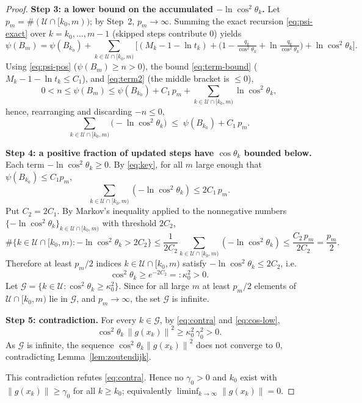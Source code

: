 \documentclass{amsart}
\theoremstyle{definition}
\newcommand{\norm}[1]{\left\lVert #1\right\rVert}
\begin{document}
\begin{proof}
\medskip\noindent\textbf{Step 3: a lower bound on the accumulated
$-\ln\cos^2\theta_k$.}
Let $p_m=\#(\mathcal{U}\cap[k_0,m))$; by Step~2, $p_m\to\infty$. Summing the
exact recursion \eqref{eq:psi-exact} over $k=k_0,\dots,m-1$ (skipped steps
contribute $0$) yields
\[
   \psi(B_m)=\psi(B_{k_0})
   +\!\!\sum_{k\in\mathcal{U}\cap[k_0,m)}\!\!
   \Big[(M_k-1-\ln t_k)
   +\big(1-\tfrac{q_k}{\cos^2\theta_k}+\ln\tfrac{q_k}{\cos^2\theta_k}\big)
   +\ln\cos^2\theta_k\Big].
\]
Using \eqref{eq:psi-pos} ($\psi(B_m)\ge n>0$), the bound \eqref{eq:term-bound}
($M_k-1-\ln t_k\le C_1$), and \eqref{eq:term2} (the middle bracket is $\le0$),
\[
   0<n\le\psi(B_m)\le\psi(B_{k_0})+C_1\,p_m
   +\!\!\sum_{k\in\mathcal{U}\cap[k_0,m)}\!\!\ln\cos^2\theta_k ,
\]
hence, rearranging and discarding $-n\le0$,
\begin{equation}\label{eq:key}
   \sum_{k\in\mathcal{U}\cap[k_0,m)}\big(-\ln\cos^2\theta_k\big)
   \;\le\;\psi(B_{k_0})+C_1\,p_m .
\end{equation}

\medskip\noindent\textbf{Step 4: a positive fraction of updated steps have
$\cos\theta_k$ bounded below.}
Each term $-\ln\cos^2\theta_k\ge0$. By \eqref{eq:key}, for all $m$ large enough
that $\psi(B_{k_0})\le C_1 p_m$,
\[
   \sum_{k\in\mathcal{U}\cap[k_0,m)}(-\ln\cos^2\theta_k)\le 2C_1\,p_m .
\]
Put $C_2=2C_1$. By Markov's inequality applied to the nonnegative numbers
$\{-\ln\cos^2\theta_k\}_{k\in\mathcal{U}\cap[k_0,m)}$ with threshold $2C_2$,
\[
   \#\{k\in\mathcal{U}\cap[k_0,m):-\ln\cos^2\theta_k>2C_2\}
   \le\frac{1}{2C_2}\sum_{k\in\mathcal{U}\cap[k_0,m)}(-\ln\cos^2\theta_k)
   \le\frac{C_2\,p_m}{2C_2}=\frac{p_m}{2}.
\]
Therefore at least $p_m/2$ indices $k\in\mathcal{U}\cap[k_0,m)$ satisfy
$-\ln\cos^2\theta_k\le2C_2$, i.e.
\begin{equation}\label{eq:cos-low}
   \cos^2\theta_k\ge e^{-2C_2}=:\kappa_0^2>0 .
\end{equation}
Let $\mathcal{G}=\{k\in\mathcal{U}:\cos^2\theta_k\ge\kappa_0^2\}$. Since for all
large $m$ at least $p_m/2$ elements of $\mathcal{U}\cap[k_0,m)$ lie in
$\mathcal{G}$, and $p_m\to\infty$, the set $\mathcal{G}$ is infinite.

\medskip\noindent\textbf{Step 5: contradiction.} For every $k\in\mathcal{G}$, by
\eqref{eq:contra} and \eqref{eq:cos-low},
\[
   \cos^2\theta_k\,\norm{g(x_k)}^2\ge\kappa_0^2\,\gamma_0^2>0 .
\]
As $\mathcal{G}$ is infinite, the sequence $\cos^2\theta_k\norm{g(x_k)}^2$ does
not converge to $0$, contradicting Lemma~\ref{lem:zoutendijk}.

This contradiction refutes \eqref{eq:contra}. Hence no $\gamma_0>0$ and $k_0$
exist with $\norm{g(x_k)}\ge\gamma_0$ for all $k\ge k_0$; equivalently
$\liminf_{k\to\infty}\norm{g(x_k)}=0$.
\end{proof}
\end{document}
